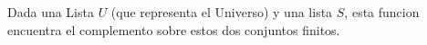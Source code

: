 Dada una Lista $U$ (que representa el Universo) y una lista $S$, esta funcion encuentra el complemento sobre estos dos conjuntos finitos.